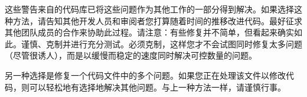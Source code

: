 这些警告来自的代码库已将这些问题作为其他工作的一部分得到解决。如果选择这种方法，请告知其他开发人员和审阅者您打算随着时间的推移改进代码。最好征求其他团队成员的合作来协助此过程。请注意：有些修复并不简单，但看起来确实如此。谨慎、克制并进行充分测试。必须克制，这样您才不会试图同时修复太多问题（尽管很诱人），而是以缓慢而稳定的速度同时解决可控数量的问题。

另一种选择是修复一个代码文件中的多个问题。如果您正在处理该文件以修改代码，则可以轻松地有选择地解决其他问题。与上一种方法一样，请谨慎行事。



















